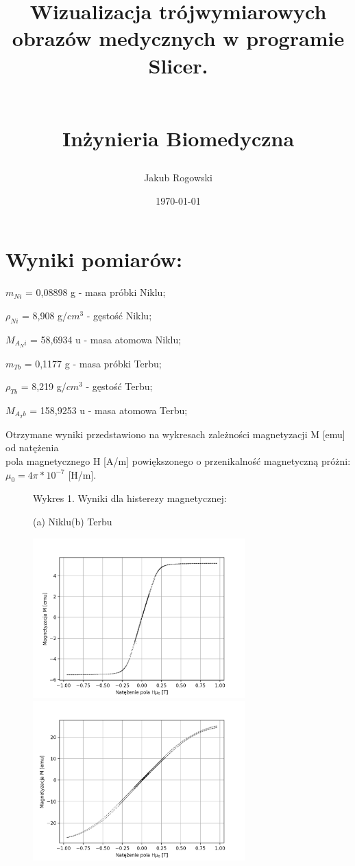 \documentclass[a4paper]{article}
\title {
\begin{center}
\begin{huge}
\textbf{Wizualizacja trójwymiarowych obrazów medycznych w programie Slicer.} 
\end{huge}
\end{center} \\[1ex] Inżynieria Biomedyczna
}
\author{Jakub Rogowski}
\date{\today}
\begin{document}
\maketitle

\section{Wyniki pomiarów:}
\vspace{0.5cm}
$m_{Ni}$ = 0,08898 g - masa próbki Niklu;

$\rho_{Ni}$ = 8,908 g/$cm^3$  - gęstość Niklu;

$M_{A_Ni}$ = 58,6934 u - masa atomowa Niklu;

\vspace{0.2cm}

$m_{Tb}$ = 0,1177 g - masa próbki Terbu;

$\rho_{Tb}$ = 8,219 g/$cm^3$ - gęstość Terbu;

$M_{A_Tb}$ = 158,9253 u - masa atomowa Terbu;



\vspace{0,5cm}
Otrzymane wyniki przedstawiono na wykresach zależności magnetyzacji M [emu] od natężenia\\ pola magnetycznego H [A/m] powiększonego  o przenikalność magnetyczną próżni: $\mu_0  = 4\pi * 10^{-7}$ [H/m].
\vspace{0.5cm}

\begin{figure}[H]
    \centering
    Wykres 1. Wyniki dla histerezy magnetycznej:
    \vspace{0.6cm}
    
    (a) Niklu\hspace{7cm}(b) Terbu
    
    \includegraphics[width=8.2cm]{Ni_dane.png}
    \includegraphics[width=8.2cm]{Tb_dane.png}
    \label{fig:my_label}
\end{figure}
\end{document}

